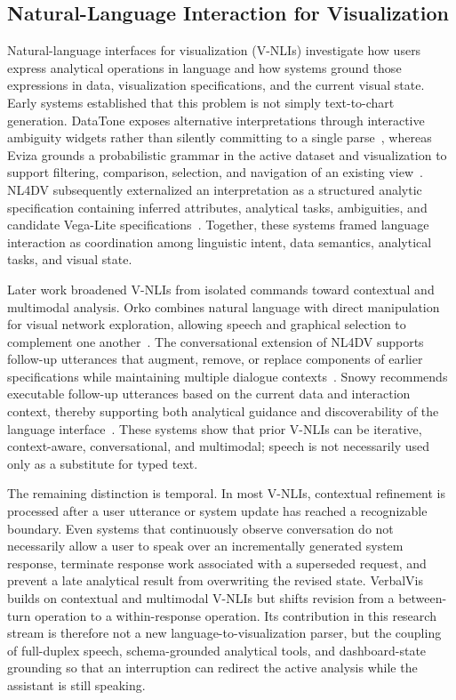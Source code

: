 \documentclass[journal]{IEEEtran}
\begin{document}
\subsection{Natural-Language Interaction for Visualization}
\label{sec:rw-nli}

Natural-language interfaces for visualization (V-NLIs) investigate how users express analytical operations in language and how systems ground those expressions in data, visualization specifications, and the current visual state. Early systems established that this problem is not simply text-to-chart generation. DataTone exposes alternative interpretations through interactive ambiguity widgets rather than silently committing to a single parse~\cite{gao2015datatone}, whereas Eviza grounds a probabilistic grammar in the active dataset and visualization to support filtering, comparison, selection, and navigation of an existing view~\cite{setlur2016eviza}. NL4DV subsequently externalized an interpretation as a structured analytic specification containing inferred attributes, analytical tasks, ambiguities, and candidate Vega-Lite specifications~\cite{narechania2021nl4dv}. Together, these systems framed language interaction as coordination among linguistic intent, data semantics, analytical tasks, and visual state.

Later work broadened V-NLIs from isolated commands toward contextual and multimodal analysis. Orko combines natural language with direct manipulation for visual network exploration, allowing speech and graphical selection to complement one another~\cite{srinivasan2018orko}. The conversational extension of NL4DV supports follow-up utterances that augment, remove, or replace components of earlier specifications while maintaining multiple dialogue contexts~\cite{mitra2022conversational}. Snowy recommends executable follow-up utterances based on the current data and interaction context, thereby supporting both analytical guidance and discoverability of the language interface~\cite{srinivasan2021snowy}. These systems show that prior V-NLIs can be iterative, context-aware, conversational, and multimodal; speech is not necessarily used only as a substitute for typed text.

The remaining distinction is temporal. In most V-NLIs, contextual refinement is processed after a user utterance or system update has reached a recognizable boundary. Even systems that continuously observe conversation do not necessarily allow a user to speak over an incrementally generated system response, terminate response work associated with a superseded request, and prevent a late analytical result from overwriting the revised state. VerbalVis builds on contextual and multimodal V-NLIs but shifts revision from a between-turn operation to a within-response operation. Its contribution in this research stream is therefore not a new language-to-visualization parser, but the coupling of full-duplex speech, schema-grounded analytical tools, and dashboard-state grounding so that an interruption can redirect the active analysis while the assistant is still speaking.
\end{document}
